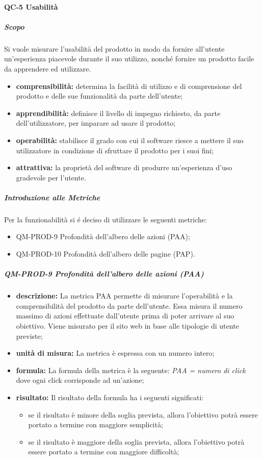 		\paragraph{QC-5 Usabilità}
			\subparagraph{Scopo}
			Si vuole misurare l'usabilità del prodotto in modo da fornire all'utente un'esperienza piacevole durante il suo utilizzo, nonché fornire un prodotto facile da apprendere ed utilizzare.
			\begin{itemize}
				\item \textbf{comprensibilità:} determina la facilità di utilizzo e di comprensione del prodotto e delle sue funzionalità da parte dell'utente;
				\item \textbf{apprendibilità:} definisce il livello di impegno richiesto, da parte dell'utilizzatore, per imparare ad usare il prodotto;
				\item \textbf{operabilità:} stabilisce il grado con cui il software riesce a mettere il suo utilizzatore in condizione di sfruttare il prodotto per i suoi fini;
				\item \textbf{attrattiva:} la proprietà del software di produrre un'esperienza d'uso gradevole per l'utente.
			\end{itemize}
			\subparagraph{Introduzione alle Metriche}
				Per la funzionabilità si é deciso di utilizzare le seguenti metriche:
				\begin{itemize}
					\item QM-PROD-9 Profondità dell'albero delle azioni (PAA);
					\item QM-PROD-10 Profondità dell'albero delle pagine (PAP).
				\end{itemize}
			\subparagraph{QM-PROD-9 Profondità dell'albero delle azioni (PAA)}
			\begin{itemize}
      			\item \textbf{descrizione: }
					La metrica PAA permette di misurare l'operabilità e la comprensibilità del prodotto da parte dell'utente. Essa misura il numero massimo di azioni effettuate dall'utente prima di poter arrivare al suo obiettivo.
					Viene misurato per il sito web in base alle tipologie di utente previste;
				\item \textbf{unità di misura: }
					La metrica è espressa con un numero intero;
				\item \textbf{formula: }
					La formula della metrica è la seguente:
					\textit{PAA = numero di click}
					dove ogni click corrisponde ad un'azione;
				\item \textbf{risultato: }
					Il risultato della formula ha i seguenti significati:
					\begin{itemize}
						\item se il risultato è minore della soglia prevista, allora l'obiettivo potrà essere portato a termine con maggiore semplicità;
						\item se il risultato è maggiore della soglia prevista, allora l'obiettivo potrà essere portato a termine con maggiore difficoltà;
					\end{itemize}
			\end{itemize}
